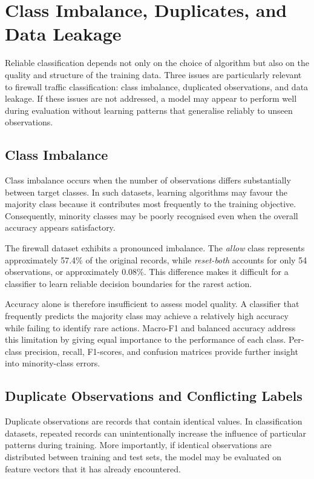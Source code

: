 \section{Class Imbalance, Duplicates, and Data Leakage}

Reliable classification depends not only on the choice of algorithm but also on the quality and structure of the training data. Three issues are particularly relevant to firewall traffic classification: class imbalance, duplicated observations, and data leakage. If these issues are not addressed, a model may appear to perform well during evaluation without learning patterns that generalise reliably to unseen observations.

\subsection{Class Imbalance}

Class imbalance occurs when the number of observations differs substantially between target classes. In such datasets, learning algorithms may favour the majority class because it contributes most frequently to the training objective. Consequently, minority classes may be poorly recognised even when the overall accuracy appears satisfactory.

The firewall dataset exhibits a pronounced imbalance. The \emph{allow} class represents approximately 57.4\% of the original records, while \emph{reset-both} accounts for only 54 observations, or approximately 0.08\%. This difference makes it difficult for a classifier to learn reliable decision boundaries for the rarest action.

Accuracy alone is therefore insufficient to assess model quality. A classifier that frequently predicts the majority class may achieve a relatively high accuracy while failing to identify rare actions. Macro-F1 and balanced accuracy address this limitation by giving equal importance to the performance of each class. Per-class precision, recall, F1-scores, and confusion matrices provide further insight into minority-class errors.

\subsection{Duplicate Observations and Conflicting Labels}

Duplicate observations are records that contain identical values. In classification datasets, repeated records can unintentionally increase the influence of particular patterns during training. More importantly, if identical observations are distributed between training and test sets, the model may be evaluated on feature vectors that it has already encountered.


